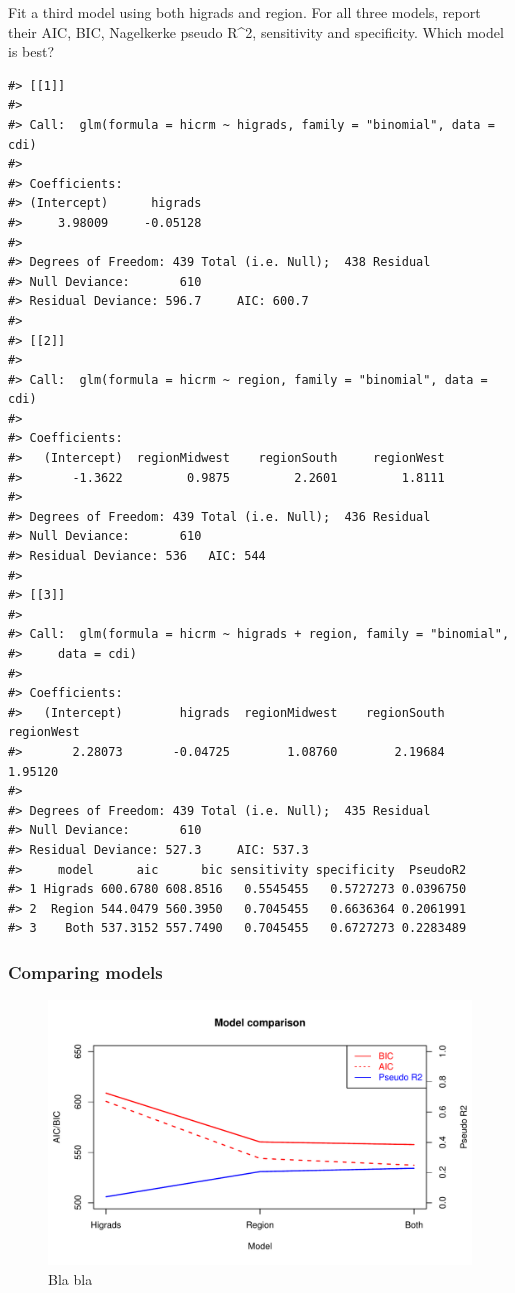 \documentclass[a4paper]{article}
\begin{document}
Fit a third model using both higrads and region. For all three models,
report their AIC, BIC, Nagelkerke pseudo R\^{}2, sensitivity and
specificity. Which model is best?

\begin{verbatim}
#> [[1]]
#> 
#> Call:  glm(formula = hicrm ~ higrads, family = "binomial", data = cdi)
#> 
#> Coefficients:
#> (Intercept)      higrads  
#>     3.98009     -0.05128  
#> 
#> Degrees of Freedom: 439 Total (i.e. Null);  438 Residual
#> Null Deviance:       610 
#> Residual Deviance: 596.7     AIC: 600.7
#> 
#> [[2]]
#> 
#> Call:  glm(formula = hicrm ~ region, family = "binomial", data = cdi)
#> 
#> Coefficients:
#>   (Intercept)  regionMidwest    regionSouth     regionWest  
#>       -1.3622         0.9875         2.2601         1.8111  
#> 
#> Degrees of Freedom: 439 Total (i.e. Null);  436 Residual
#> Null Deviance:       610 
#> Residual Deviance: 536   AIC: 544
#> 
#> [[3]]
#> 
#> Call:  glm(formula = hicrm ~ higrads + region, family = "binomial", 
#>     data = cdi)
#> 
#> Coefficients:
#>   (Intercept)        higrads  regionMidwest    regionSouth     regionWest  
#>       2.28073       -0.04725        1.08760        2.19684        1.95120  
#> 
#> Degrees of Freedom: 439 Total (i.e. Null);  435 Residual
#> Null Deviance:       610 
#> Residual Deviance: 527.3     AIC: 537.3
#>     model      aic      bic sensitivity specificity  PseudoR2
#> 1 Higrads 600.6780 608.8516   0.5545455   0.5727273 0.0396750
#> 2  Region 544.0479 560.3950   0.7045455   0.6636364 0.2061991
#> 3    Both 537.3152 557.7490   0.7045455   0.6727273 0.2283489
\end{verbatim}

\subsubsection{Comparing models}\label{comparing-models}

\begin{figure}[h]
\includegraphics{Project_2_files/figure-latex/comparison_plot-1} \caption{Bla bla}\label{fig:comparison_plot}
\end{figure}
\end{document}

